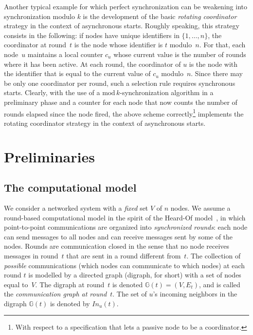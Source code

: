 \documentclass[11pt,letterpaper]{article}
\begin{document}
Another typical example for which perfect synchronization can be weakening into synchronization modulo $k$ is
	the development of the basic \emph{rotating coordinator} strategy in the context of asynchronous starts.
Roughly speaking, this strategy consists in the following: if nodes have unique identifiers in $\{1,\dots,n\}$,
	the coordinator at round~$t$ is the node whose identifier is  $t$ modulo~$n$.
For that, 	 each node~$u$ maintains a local counter $c_u$
	whose current value is the number of rounds where it has been active.
At each round, the  coordinator of $u$ is the  node with the identifier that is equal to the current value of $c_u$ modulo~$n$.
Since there may be only one coordinator per round, such a selection rule requires synchronous starts.
Clearly, with the use of a $\mathrm{mod}\,k$-synchronization algorithm in a preliminary phase and a
	counter for each node that now counts the number of rounds elapsed since the node fired, the above scheme correctly\footnote{%
	With respect to a specification that lets a passive node to be  a coordinator.}
	implements the rotating coordinator strategy in the context of asynchronous starts.

\section{Preliminaries}\label{sec:model}
 
\subsection{The computational model}
	
We consider a networked system with a {\em fixed} set $V$ of $n$ nodes.
We assume a round-based computational model  in the spirit of the Heard-Of model~\cite{CBS09}, 
	in which point-to-point communications are organized into \emph{synchronized rounds}: 
	each node can send messages  to all nodes and can receive messages sent  by some of the nodes.
Rounds are communication closed in the sense that no node receives messages in round~$t$ that are sent 
	in a round different from~$t$. 
The collection of \emph{possible} communications (which nodes can communicate to which nodes) at each round $t$
	is modelled by a directed graph (digraph, for short) with a set of nodes equal to~$V$.
The digraph at round~$t$ is  denoted $\mathds{G}(t)=(V,E_t)$, and is called the \emph{communication graph at round}~$t$. 
The set of $u$'s incoming neighbors in the digraph $\mathds{G}(t)$ is denoted by $In_u(t)$.
\end{document}
